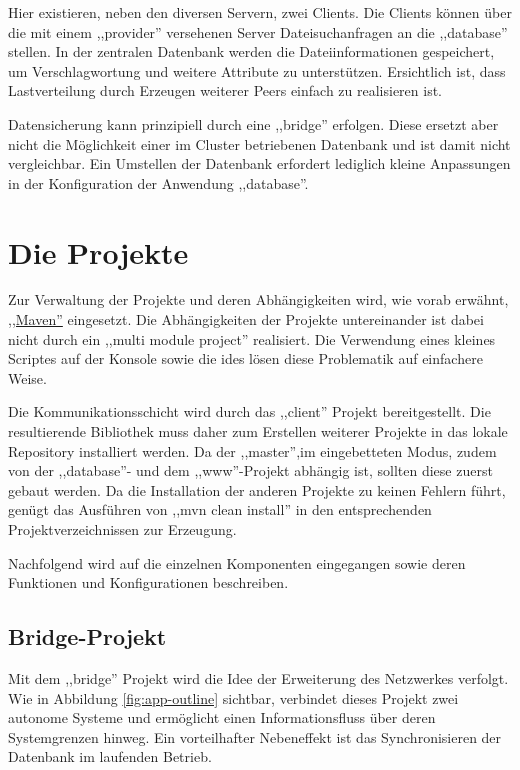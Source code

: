 \documentclass[oneside, ngerman, toc=bibliography,bibliography=totoc,listof=entryprefix, open=right,numbers=noenddot,fontsize=12pt]{scrbook}
\begin{document}
 

Hier existieren, neben den diversen Servern, zwei Clients. Die Clients können über die mit einem ,,provider'' versehenen Server Dateisuchanfragen an die ,,database'' stellen.
In der zentralen Datenbank werden die Dateiinformationen gespeichert, um Verschlagwortung und weitere Attribute zu unterstützen.
Ersichtlich ist, dass Lastverteilung durch Erzeugen weiterer Peers einfach zu realisieren ist. 

Datensicherung kann prinzipiell durch eine ,,bridge'' erfolgen. Diese ersetzt aber nicht die Möglichkeit einer im Cluster betriebenen Datenbank und ist damit nicht vergleichbar. Ein Umstellen der Datenbank erfordert lediglich kleine  Anpassungen  in der Konfiguration  der Anwendung ,,database''.


\section{Die Projekte}
Zur Verwaltung der Projekte und deren Abhängigkeiten wird, wie vorab erwähnt, \href{https://maven.apache.org/}{,,Maven''} eingesetzt.
Die Abhängigkeiten der Projekte untereinander ist dabei nicht durch ein  ,,multi module project'' realisiert. Die Verwendung eines  kleines Scriptes auf der Konsole sowie die \acrshort{ide}s lösen diese Problematik auf einfachere Weise. 

Die Kommunikationsschicht wird durch das ,,client'' Projekt bereitgestellt.
Die resultierende Bibliothek muss daher zum Erstellen weiterer Projekte in das lokale Repository installiert werden.
Da der ,,master'',im eingebetteten Modus, zudem von der ,,database''- und dem ,,www''-Projekt abhängig ist, sollten diese zuerst gebaut werden.
Da die Installation der anderen Projekte zu keinen Fehlern führt, genügt das Ausführen von ,,mvn clean install'' in den entsprechenden Projektverzeichnissen zur Erzeugung.

Nachfolgend wird auf die einzelnen Komponenten eingegangen sowie deren Funktionen und Konfigurationen beschreiben.


\subsection{Bridge-Projekt}
Mit dem ,,bridge'' Projekt wird die Idee der Erweiterung des Netzwerkes verfolgt. Wie in Abbildung \ref{fig:app-outline} sichtbar, verbindet dieses Projekt zwei autonome Systeme und ermöglicht einen Informationsfluss über deren Systemgrenzen hinweg. Ein vorteilhafter Nebeneffekt ist das Synchronisieren der Datenbank im laufenden Betrieb.
\end{document}
